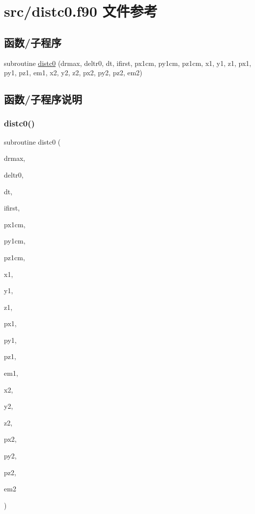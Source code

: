 \hypertarget{distc0_8f90}{}\section{src/distc0.f90 文件参考}
\label{distc0_8f90}
\subsection*{函数/子程序}
\begin{DoxyCompactItemize}
\item 
subroutine \mbox{\hyperlink{distc0_8f90_a3d29bb4aa6c6b2a142adef876b0ebee8}{distc0}} (drmax, deltr0, dt, ifirst, px1cm, py1cm, pz1cm, x1, y1, z1, px1, py1, pz1, em1, x2, y2, z2, px2, py2, pz2, em2)
\end{DoxyCompactItemize}


\subsection{函数/子程序说明}
\mbox{\label{distc0_8f90_a3d29bb4aa6c6b2a142adef876b0ebee8}} 
\subsubsection{\texorpdfstring{distc0()}{distc0()}}
{\footnotesize\ttfamily subroutine distc0 (\begin{DoxyParamCaption}\item[{}]{drmax,  }\item[{}]{deltr0,  }\item[{}]{dt,  }\item[{}]{ifirst,  }\item[{}]{px1cm,  }\item[{}]{py1cm,  }\item[{}]{pz1cm,  }\item[{}]{x1,  }\item[{}]{y1,  }\item[{}]{z1,  }\item[{}]{px1,  }\item[{}]{py1,  }\item[{}]{pz1,  }\item[{}]{em1,  }\item[{}]{x2,  }\item[{}]{y2,  }\item[{}]{z2,  }\item[{}]{px2,  }\item[{}]{py2,  }\item[{}]{pz2,  }\item[{}]{em2 }\end{DoxyParamCaption})}



